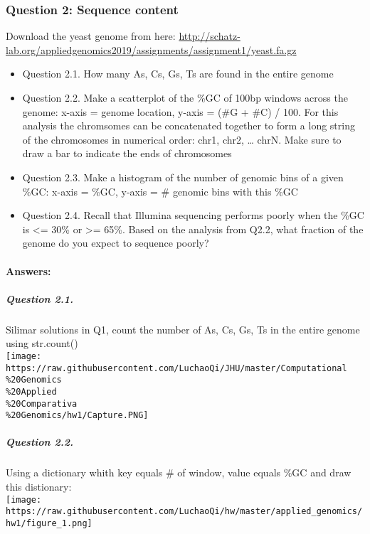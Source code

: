 \documentclass[]{article}
\providecommand{\tightlist}{%
  \setlength{\itemsep}{0pt}\setlength{\parskip}{0pt}}
\let\oldparagraph\paragraph
\renewcommand{\paragraph}[1]{\oldparagraph{#1}\mbox{}}
\let\oldsubparagraph\subparagraph
\renewcommand{\subparagraph}[1]{\oldsubparagraph{#1}\mbox{}}
\begin{document}
\subsubsection{Question 2: Sequence
content}\label{question-2-sequence-content}

Download the yeast genome from here:
\url{http://schatz-lab.org/appliedgenomics2019/assignments/assignment1/yeast.fa.gz}

\begin{itemize}
\tightlist
\item
  Question 2.1. How many As, Cs, Gs, Ts are found in the entire genome
\item
  Question 2.2. Make a scatterplot of the \%GC of 100bp windows across
  the genome: x-axis = genome location, y-axis = (\#G + \#C) / 100. For
  this analysis the chromsomes can be concatenated together to form a
  long string of the chromosomes in numerical order: chr1, chr2,
  \ldots{} chrN. Make sure to draw a bar to indicate the ends of
  chromosomes
\item
  Question 2.3. Make a histogram of the number of genomic bins of a
  given \%GC: x-axis = \%GC, y-axis = \# genomic bins with this \%GC
\item
  Question 2.4. Recall that Illumina sequencing performs poorly when the
  \%GC is \textless{}= 30\% or \textgreater{}= 65\%. Based on the
  analysis from Q2.2, what fraction of the genome do you expect to
  sequence poorly?
\end{itemize}

\paragraph{Answers:}\label{answers-1}

\subparagraph{Question 2.1.}\label{question-2.1.}

Silimar solutions in Q1, count the number of As, Cs, Gs, Ts in the
entire genome using str.count()\\
\texttt{[image: https://raw.githubusercontent.com/LuchaoQi/JHU/master/Computational\\\%20Genomics\\\%20Applied\\\%20Comparativa\\\%20Genomics/hw1/Capture.PNG]}

\subparagraph{Question 2.2.}\label{question-2.2.}

Using a dictionary whith key equals \# of window, value equals \%GC and
draw this distionary:\\
\texttt{[image: https://raw.githubusercontent.com/LuchaoQi/hw/master/applied\_genomics/hw1/figure\_1.png]}
\end{document}
